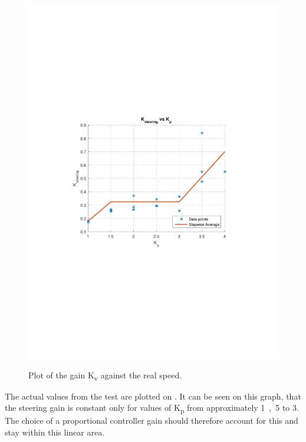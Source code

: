 \begin{figure}[H]
  \centering
  {
    \includegraphics[width=1.2\textwidth]{figures/KvVsKp.pdf}
  }
  \caption{Plot of the gain \si{K_v} against the real speed.}
  \label{fig:steeringPlotKsteeringVsKp}
\end{figure}\vspace{-5mm}
%
The actual values from the test are plotted on . It can be seen on this graph, that the steering gain is constant only for values of \si{K_p} from approximately \si{1,5} to \si{3}. The choice of a proportional controller gain should therefore account for this and stay within this linear area.